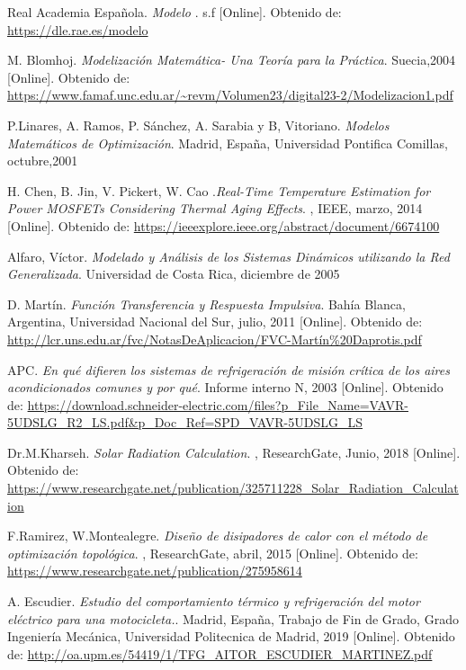 \documentclass[notitlepage,oneside]{book}
\begin{document}
\begin{thebibliography}{99}
Real Academia Española. \emph {Modelo }. s.f [Online]. Obtenido de: \url{https://dle.rae.es/modelo}

M. Blomhoj. \emph {Modelización Matemática- Una Teoría para la Práctica}. Suecia,2004 [Online]. Obtenido de: \url{https://www.famaf.unc.edu.ar/~revm/Volumen23/digital23-2/Modelizacion1.pdf}

P.Linares, A. Ramos, P. Sánchez, A. Sarabia y B, Vitoriano. \emph {Modelos Matemáticos de Optimización}. Madrid, España, Universidad Pontifica Comillas, octubre,2001

H. Chen, B. Jin, V. Pickert, W. Cao .\emph {Real-Time Temperature Estimation for Power MOSFETs Considering Thermal Aging Effects}. , IEEE, marzo, 2014 [Online]. Obtenido de: \url{https://ieeexplore.ieee.org/abstract/document/6674100}

Alfaro, Víctor. \emph {Modelado y Análisis de los Sistemas Dinámicos utilizando la Red Generalizada}. Universidad de Costa Rica, diciembre de 2005

D. Martín. \emph {Función Transferencia y Respuesta Impulsiva}. Bahía Blanca, Argentina, Universidad Nacional del Sur, julio, 2011 [Online]. Obtenido de: \url{http://lcr.uns.edu.ar/fvc/NotasDeAplicacion/FVC-Martín\%20Daprotis.pdf}

APC. \emph {En qué difieren los sistemas de refrigeración de misión crítica de los aires acondicionados comunes y por qué}. Informe interno N, 2003 [Online]. Obtenido de: \url{https://download.schneider-electric.com/files?p_File_Name=VAVR-5UDSLG_R2_LS.pdf&p_Doc_Ref=SPD_VAVR-5UDSLG_LS}

Dr.M.Kharseh. \emph {Solar Radiation Calculation}. , ResearchGate, Junio, 2018 [Online]. Obtenido de: \url{https://www.researchgate.net/publication/325711228_Solar_Radiation_Calculation}

F.Ramirez, W.Montealegre. \emph {Diseño de disipadores de calor con el método de optimización topológica}. , ResearchGate, abril, 2015 [Online]. Obtenido de: \url{https://www.researchgate.net/publication/275958614}

A. Escudier. \emph {Estudio del comportamiento térmico y refrigeración del motor eléctrico para una motocicleta.}. Madrid, España, Trabajo de Fin de Grado, Grado Ingeniería Mecánica, Universidad Politecnica de Madrid, 2019 [Online]. Obtenido de: \url{http://oa.upm.es/54419/1/TFG_AITOR_ESCUDIER_MARTINEZ.pdf}



\end{thebibliography}
\end{document}

